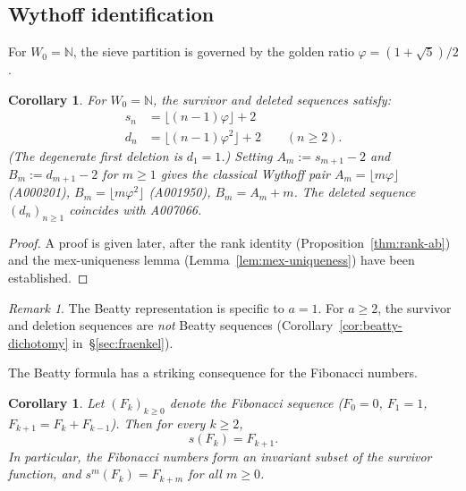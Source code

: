 \documentclass[11pt]{article}
\numberwithin{equation}{section}
\theoremstyle{plain}
\newtheorem{corollary}[theorem]{Corollary}
\theoremstyle{definition}
\theoremstyle{remark}
\newtheorem{remark}[theorem]{Remark}
\newcommand{\N}{\mathbb{N}}
\begin{document}
\subsection{Wythoff identification}\label{sec:wythoff}

For $W_0 = \N$, the sieve partition is governed by the golden ratio
$\varphi = (1+\sqrt5)/2$.

\begin{corollary}\label{cor:wythoff}
For $W_0=\N$, the survivor and deleted sequences satisfy:
\begin{align}
  s_n &= \lfloor (n-1)\varphi \rfloor + 2
       \label{eq:surv-beatty}\\
  d_n &= \lfloor (n-1)\varphi^2 \rfloor + 2
       \qquad (n\ge2).
       \label{eq:del-beatty}
\end{align}
(The degenerate first deletion is $d_1=1$.)
Setting $A_m:=s_{m+1}-2$ and $B_m:=d_{m+1}-2$ for $m\ge1$ gives the
classical Wythoff pair
$A_m = \lfloor m\varphi\rfloor$ \textup{(A000201)},\;
$B_m = \lfloor m\varphi^2\rfloor$ \textup{(A001950)},\;
$B_m = A_m + m$.
The deleted sequence $(d_n)_{n\ge1}$ coincides with A007066.
\end{corollary}

\begin{proof}
A proof is given later, after the rank identity
(Proposition~\ref{thm:rank-ab}) and the mex-uniqueness lemma
(Lemma~\ref{lem:mex-uniqueness}) have been established.
\end{proof}

\begin{remark}\label{rem:beatty-intro}
The Beatty representation is specific to $a=1$.  For $a \ge 2$,
the survivor and deletion sequences are \emph{not} Beatty sequences
(Corollary~\ref{cor:beatty-dichotomy} in~\S\ref{sec:fraenkel}).
\end{remark}

The Beatty formula has a striking consequence for the Fibonacci numbers.

\begin{corollary}\label{cor:fib-invariance}
Let $(F_k)_{k\ge0}$ denote the Fibonacci sequence ($F_0=0$, $F_1=1$,
$F_{k+1}=F_k+F_{k-1}$).  Then for every $k\ge2$,
\begin{equation}\label{eq:fib-invariance}
  s(F_k) = F_{k+1}.
\end{equation}
In particular, the Fibonacci numbers form an invariant subset of
the survivor function, and $s^m(F_k) = F_{k+m}$ for all $m\ge0$.
\end{corollary}
\end{document}
